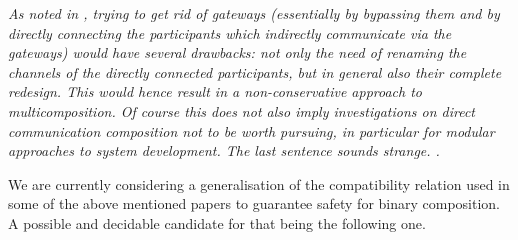 

\begin{remark}
\label{rem:dircomm}
{\em
As noted in \cite[Sect.5.3]{BdLH19}, trying to get rid of gateways (essentially by bypassing them
and by directly connecting the participants which indirectly communicate via the gateways)
would have several drawbacks: not only the need of renaming the channels of the directly connected participants, but in general also their complete redesign.
This would hence result in a non-conservative approach to multicomposition.
Of course this does not also imply investigations on direct communication composition
not to be worth pursuing, in particular for modular approaches to system development.
\brc The last sentence sounds strange. \erc.
\finex}
\end{remark}


We are currently considering a generalisation of the compatibility relation used 
in some of the above mentioned papers to guarantee safety for binary composition.
A possible and decidable candidate for that being the following one.\\
